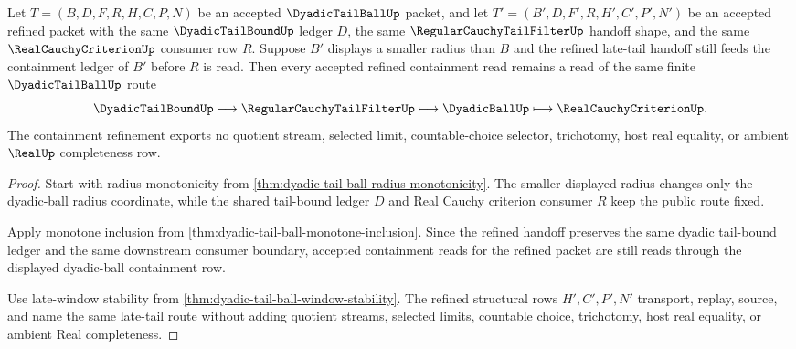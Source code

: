 \begin{theorem}
\label{thm:dyadic-tail-ball-radius-monotone-containment}
Let $T=(B,D,F,R,H,C,P,N)$ be an accepted $\DyadicTailBallUp$ packet, and let $T'=(B',D,F',R,H',C',P',N')$ be an accepted refined packet with the same $\DyadicTailBoundUp$ ledger $D$, the same $\RegularCauchyTailFilterUp$ handoff shape, and the same $\RealCauchyCriterionUp$ consumer row $R$. Suppose $B'$ displays a smaller radius than $B$ and the refined late-tail handoff still feeds the containment ledger of $B'$ before $R$ is read. Then every accepted refined containment read remains a read of the same finite $\DyadicTailBallUp$ route
$$
\DyadicTailBoundUp \longmapsto \RegularCauchyTailFilterUp \longmapsto \DyadicBallUp \longmapsto \RealCauchyCriterionUp .
$$
The containment refinement exports no quotient stream, selected limit, countable-choice selector, trichotomy, host real equality, or ambient $\RealUp$ completeness row.
\end{theorem}
\begin{proof}
Start with radius monotonicity from \autoref{thm:dyadic-tail-ball-radius-monotonicity}. The smaller displayed radius changes only the dyadic-ball radius coordinate, while the shared tail-bound ledger $D$ and Real Cauchy criterion consumer $R$ keep the public route fixed.

Apply monotone inclusion from \autoref{thm:dyadic-tail-ball-monotone-inclusion}. Since the refined handoff preserves the same dyadic tail-bound ledger and the same downstream consumer boundary, accepted containment reads for the refined packet are still reads through the displayed dyadic-ball containment row.

Use late-window stability from \autoref{thm:dyadic-tail-ball-window-stability}. The refined structural rows $H',C',P',N'$ transport, replay, source, and name the same late-tail route without adding quotient streams, selected limits, countable choice, trichotomy, host real equality, or ambient Real completeness.
\end{proof}

